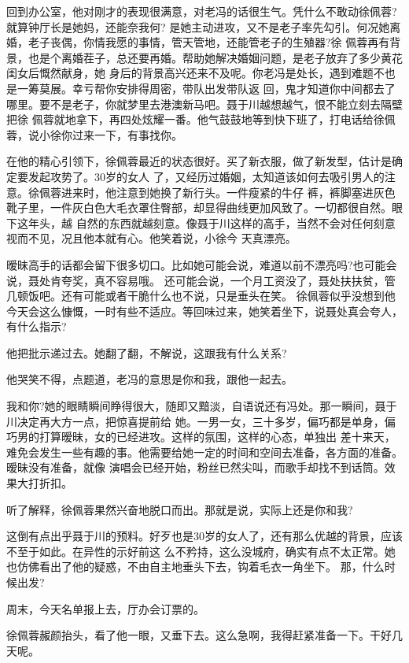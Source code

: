 \documentclass[11pt,a4paper,onecolumn]{article}
\begin{document}
回到办公室，他对刚才的表现很满意，对老冯的话很生气。凭什么不敢动徐佩蓉?就算钟厅长是她妈，还能奈我何?
是她主动进攻，又不是老子率先勾引。何况她离婚，老子丧偶，你情我愿的事情，管天管地，还能管老子的生殖器?徐
佩蓉再有背景，也是个离婚茬子，总还要再婚。帮助她解决婚姻问题，是老子放弃了多少黄花闺女后慨然献身，她
身后的背景高兴还来不及呢。你老冯是处长，遇到难题不也是一筹莫展。幸亏帮你安排得周密，带队出发带队返
回，鬼才知道你中间都去了哪里。要不是老子，你就梦里去港澳新马吧。聂于川越想越气，恨不能立刻去隔壁把徐
佩蓉就地拿下，再四处炫耀一番。他气鼓鼓地等到快下班了，打电话给徐佩蓉，说小徐你过来一下，有事找你。

在他的精心引领下，徐佩蓉最近的状态很好。买了新衣服，做了新发型，估计是确定要发起攻势了。30岁的女人
了，又经历过婚姻，太知道该如何去吸引男人的注意。徐佩蓉进来时，他注意到她换了新行头。一件瘦紧的牛仔
裤，裤脚塞进灰色靴子里，一件灰白色大毛衣罩住臀部，却显得曲线更加风致了。一切都很自然。眼下这年头，越
自然的东西就越刻意。像聂于川这样的高手，当然不会对任何刻意视而不见，况且他本就有心。他笑着说，小徐今
天真漂亮。

暧昧高手的话都会留下很多切口。比如她可能会说，难道以前不漂亮吗?也可能会说，聂处肯夸奖，真不容易哦。
还可能会说，一个月工资没了，聂处扶扶贫，管几顿饭吧。还有可能\myrule{}或者干脆什么也不说，只是垂头在笑。
徐佩蓉似乎没想到他今天会这么慷慨，一时有些不适应。等回味过来，她笑着坐下，说聂处真会夸人，有什么指示?

他把批示递过去。她翻了翻，不解说，这跟我有什么关系?

他哭笑不得，点题道，老冯的意思是你和我，跟他一起去。

我和你?她的眼睛瞬间睁得很大，随即又黯淡，自语说还有冯处。那一瞬间，聂于川决定再大方一点，把惊喜提前给
她。一男一女，三十多岁，偏巧都是单身，偏巧男的打算暧昧，女的已经进攻。这样的氛围，这样的心态，单独出
差十来天，难免会发生一些有趣的事。他需要给她一定的时间和空间去准备，各方面的准备。暧昧没有准备，就像
演唱会已经开始，粉丝已然尖叫，而歌手却找不到话筒。效果大打折扣。

听了解释，徐佩蓉果然兴奋地脱口而出。那就是说，实际上还是你和我?

这倒有点出乎聂于川的预料。好歹也是30岁的女人了，还有那么优越的背景，应该不至于如此。在异性的示好前这
么不矜持，这么没城府，确实有点不太正常。她也仿佛看出了他的疑惑，不由自主地垂头下去，钩着毛衣一角坐下。
那，什么时候出发?

周末，今天名单报上去，厅办会订票的。

徐佩蓉赧颜抬头，看了他一眼，又垂下去。这么急啊，我得赶紧准备一下。干好几天呢。
\end{document}

